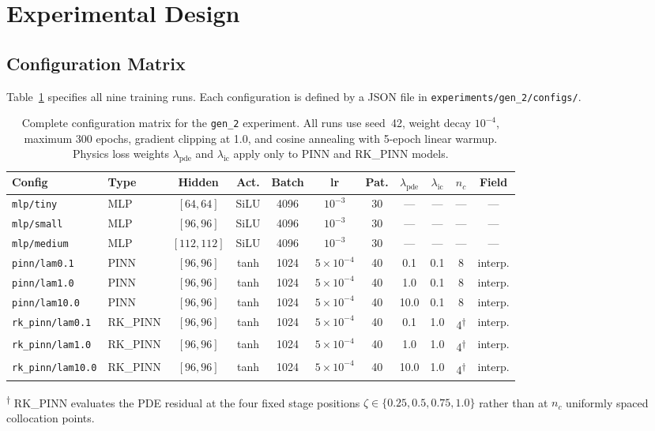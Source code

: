 \documentclass[a4paper,11pt]{article}
\begin{document}
\section{Experimental Design}
\label{sec:experimental_design}

\subsection{Configuration Matrix}

Table~\ref{tab:configs} specifies all nine training runs.  Each
configuration is defined by a JSON file in
\texttt{experiments/gen\_2/configs/}.

\begin{table}[htbp]
\centering
\caption{Complete configuration matrix for the \texttt{gen\_2} experiment.
All runs use seed~42, weight decay $10^{-4}$, maximum 300 epochs,
gradient clipping at 1.0, and cosine annealing with 5-epoch linear warmup.
Physics loss weights $\lambda_\text{pde}$ and $\lambda_\text{ic}$ apply
only to PINN and RK\_PINN models.}
\label{tab:configs}
\footnotesize
\begin{tabular}{llccccccccc}
Config & Type & Hidden & Act. & Batch & lr & Pat. &
  $\lambda_\text{pde}$ & $\lambda_\text{ic}$ & $n_c$ & Field \\
\hline
\texttt{mlp/tiny}       & MLP     & $[64,64]$   & SiLU & 4096 & $10^{-3}$
  & 30 & --- & --- & --- & --- \\
\texttt{mlp/small}      & MLP     & $[96,96]$   & SiLU & 4096 & $10^{-3}$
  & 30 & --- & --- & --- & --- \\
\texttt{mlp/medium}     & MLP     & $[112,112]$ & SiLU & 4096 & $10^{-3}$
  & 30 & --- & --- & --- & --- \\
\texttt{pinn/lam0.1}    & PINN    & $[96,96]$   & tanh & 1024 & $5 \times 10^{-4}$
  & 40 & 0.1  & 0.1 & 8 & interp. \\
\texttt{pinn/lam1.0}    & PINN    & $[96,96]$   & tanh & 1024 & $5 \times 10^{-4}$
  & 40 & 1.0  & 0.1 & 8 & interp. \\
\texttt{pinn/lam10.0}   & PINN    & $[96,96]$   & tanh & 1024 & $5 \times 10^{-4}$
  & 40 & 10.0 & 0.1 & 8 & interp. \\
\texttt{rk\_pinn/lam0.1}  & RK\_PINN & $[96,96]$ & tanh & 1024 & $5 \times 10^{-4}$
  & 40 & 0.1  & 1.0 & 4\textsuperscript{$\dagger$} & interp. \\
\texttt{rk\_pinn/lam1.0}  & RK\_PINN & $[96,96]$ & tanh & 1024 & $5 \times 10^{-4}$
  & 40 & 1.0  & 1.0 & 4\textsuperscript{$\dagger$} & interp. \\
\texttt{rk\_pinn/lam10.0} & RK\_PINN & $[96,96]$ & tanh & 1024 & $5 \times 10^{-4}$
  & 40 & 10.0 & 1.0 & 4\textsuperscript{$\dagger$} & interp. \\
\end{tabular}
\begin{flushleft}
\textsuperscript{$\dagger$} RK\_PINN evaluates the PDE residual at the
four fixed stage positions $\zeta \in \{0.25, 0.5, 0.75, 1.0\}$ rather
than at $n_c$ uniformly spaced collocation points.
\end{flushleft}
\end{table}
\end{document}

